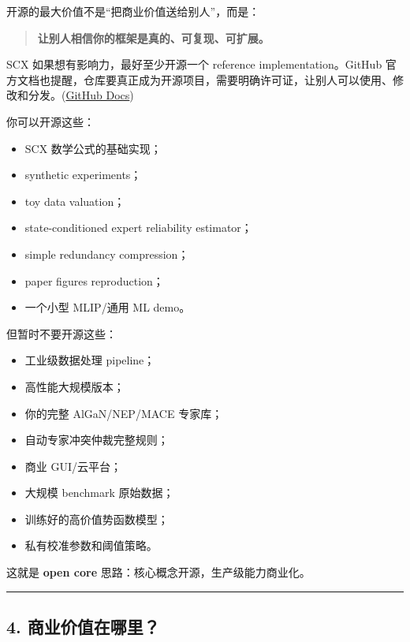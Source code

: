 \documentclass[
  12pt,
]{ctexart}
\providecommand{\tightlist}{%
  \setlength{\itemsep}{0pt}\setlength{\parskip}{0pt}}
\begin{document}
开源的最大价值不是``把商业价值送给别人''，而是：

\begin{quote}
\textbf{让别人相信你的框架是真的、可复现、可扩展。}
\end{quote}

SCX 如果想有影响力，最好至少开源一个 reference implementation。GitHub
官方文档也提醒，仓库要真正成为开源项目，需要明确许可证，让别人可以使用、修改和分发。(\href{https://docs.github.com/articles/licensing-a-repository?utm_source=chatgpt.com}{GitHub
Docs})

你可以开源这些：

\begin{itemize}
\tightlist
\item
  SCX 数学公式的基础实现；
\item
  synthetic experiments；
\item
  toy data valuation；
\item
  state-conditioned expert reliability estimator；
\item
  simple redundancy compression；
\item
  paper figures reproduction；
\item
  一个小型 MLIP/通用 ML demo。
\end{itemize}

但暂时不要开源这些：

\begin{itemize}
\tightlist
\item
  工业级数据处理 pipeline；
\item
  高性能大规模版本；
\item
  你的完整 AlGaN/NEP/MACE 专家库；
\item
  自动专家冲突仲裁完整规则；
\item
  商业 GUI/云平台；
\item
  大规模 benchmark 原始数据；
\item
  训练好的高价值势函数模型；
\item
  私有校准参数和阈值策略。
\end{itemize}

这就是 \textbf{open core} 思路：核心概念开源，生产级能力商业化。

\begin{center}\rule{0.5\linewidth}{0.5pt}\end{center}

\subsection{4.
商业价值在哪里？}\label{ux5546ux4e1aux4ef7ux503cux5728ux54eaux91cc}
\end{document}
